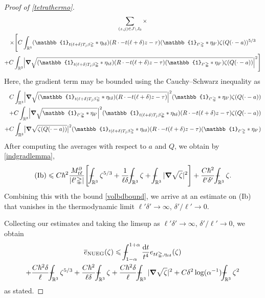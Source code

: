 \documentclass[10pt,a4paper]{amsart}
\newcommand{\NUEG}{\mathrm{NUEG}} %
\newcommand{\RR}{\mathbb{R}}
\def\XXint#1#2#3{{\setbox0=\hbox{$#1{#2#3}{\int}$ }
\vcenter{\hbox{$#2#3$ }}\kern-.6\wd0}}
\def\Xint#1{\mathchoice
{\XXint\displaystyle\textstyle{#1}}%
{\XXint\textstyle\scriptstyle{#1}}%
{\XXint\scriptstyle\scriptscriptstyle{#1}}%
{\XXint\scriptscriptstyle\scriptscriptstyle{#1}}%
\!\int}
\def\dashint{\Xint-}
\newcommand{\dd}{\mathrm{d}} %
\newcommand{\grad}{\bm{\nabla}} %
\newcommand{\iden}{\mathbb{1}} %
\renewcommand{\le}{\leqslant}
\newcommand{\ol}[1]{\overline{#1}}
\newcommand{\tetra}{\mathbb{\Delta}} %
\begin{document}
\begin{proof}[Proof of \cref{tetrathermo}]
\begin{multline*}
\sum_{(z,j)\in J\setminus J_0} \times\\
	\times\Bigg[ C\int_{\RR^3}  (\iden_{t(\ell+\delta) T_j \beta\tetra} * \eta_{t\delta})(R\cdot - t(\ell+\delta) z - \tau)(\iden_{\ell'\tetra}*\eta_{\delta'})\zeta(Q(\cdot - a))^{5/3}\\
    + C \int_{\RR^3} \Bigl|\grad\sqrt{(\iden_{t(\ell+\delta) T_j \beta\tetra} * \eta_{t\delta})(R\cdot - t(\ell+\delta) z - \tau)(\iden_{\ell'\tetra}*\eta_{\delta'})\zeta(Q(\cdot - a))}\Bigr|^2 \Bigg]
\end{multline*}
Here, the gradient term may be bounded using the Cauchy--Schwarz inequality as
\begin{align*}
C\int_{\RR^3} \Bigl|\grad\sqrt{(\iden_{t(\ell+\delta) T_j \beta\tetra} * \eta_{t\delta})(R\cdot - t(\ell+\delta) z - \tau)}\Bigr|^2(\iden_{\ell'\tetra}*\eta_{\delta'})\zeta(Q(\cdot - a))\\
+C\int_{\RR^3} \Bigl|\grad\sqrt{\iden_{\ell'\tetra}*\eta_{\delta'}}\Bigr|^2
(\iden_{t(\ell+\delta) T_j \beta\tetra} * \eta_{t\delta})(R\cdot - t(\ell+\delta) z - \tau)\zeta(Q(\cdot - a))\\
+C\int_{\RR^3} \bigl|\grad\sqrt{\zeta(Q(\cdot - a))}\bigr|^2(\iden_{t(\ell+\delta) T_j \beta\tetra} * \eta_{t\delta})(R\cdot - t(\ell+\delta) z - \tau)(\iden_{\ell'\tetra}*\eta_{\delta'})
\end{align*}
After computing the averages with respect to $a$ and $Q$, we obtain by \cref{indgradlemma},
\begin{equation}\label{ebduest}
\mathrm{(Ib)}\le C\hbar^2 \frac{M_{t\ell}^\partial}{|\ell'\tetra|}\Bigg[ \dashint_{\RR^3} \zeta^{5/3} + \frac{1}{\ell\delta}\dashint_{\RR^3}\zeta + \dashint_{\RR^3} |\grad\sqrt{\zeta}|^2\Bigg] + \frac{C\hbar^2}{\ell'\delta'}\dashint_{\RR^3}\zeta.
\end{equation}
Combining this with the bound \cref{volbdbound}, we arrive at an estimate on (Ib) that vanishes in the thermodynamic limit $\ell'\delta'\to\infty$, $\delta'/\ell'\to 0$. 

Collecting our estimates and taking the limsup as $\ell'\delta'\to\infty$, $\delta'/\ell'\to 0$, we obtain
\begin{multline*}
\ol{e}_{\NUEG}(\zeta)\le \dashint_{1-\alpha}^{1+\alpha}\frac{\dd t}{t^4} e_{t\ell\tetra,\eta_{t\delta}}(\zeta)\\
+\frac{C\hbar^2\delta}{\ell} \dashint_{\RR^3}\zeta^{5/3} +  \frac{C\hbar^2}{\ell\delta} \dashint_{\RR^3} \zeta + \frac{C\hbar^2\delta}{\ell}\dashint_{\RR^3} |\grad\sqrt{\zeta}|^2+ C\delta^2\log(\alpha^{-1}) \dashint_{\RR^3}\zeta^2
\end{multline*}
as stated.


\end{proof}
\end{document}
